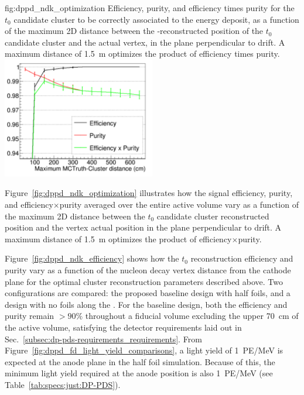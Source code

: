 \begin{dunefigure}{fig:dppd_ndk_optimization}
{Efficiency, purity, and efficiency times purity for the $t_0$ candidate cluster to be correctly associated to the  energy deposit, as a function of the maximum 2D distance between the -reconstructed position of the $t_0$ candidate cluster and the actual  vertex, in the plane perpendicular to drift. A maximum distance of \SI{1.5}{\m} optimizes the product of efficiency times purity.}
\includegraphics[width=0.5\textwidth]{graphics/dppd_ndk_optimization.pdf}
\end{dunefigure}

Figure~\ref{fig:dppd_ndk_optimization} illustrates how the  signal efficiency, purity, and efficiency$\times$purity averaged over the entire  active volume vary as a function of the maximum 2D distance between the $t_0$ candidate cluster reconstructed position and the  vertex actual position in the plane perpendicular to drift. A maximum distance of \SI{1.5}{\m} optimizes the product of efficiency$\times$purity. 

Figure~\ref{fig:dppd_ndk_efficiency} shows how the  $t_0$ reconstruction efficiency and purity vary as a function of the nucleon decay vertex distance from the cathode plane for the optimal cluster reconstruction parameters described above. Two configurations are compared: the proposed baseline design with half foils, and a design with no foils along the . For the baseline design, both the efficiency and purity remain $>90\%$ throughout a  fiducial volume excluding the upper \SI{70}{cm} of the  active volume, satisfying the detector requirements laid out in Sec.~\ref{subsec:dp-pds-requirements_requirements}. From Figure~\ref{fig:dppd_fd_light_yield_comparisons}, a light yield of \SI{1}{PE/\MeV} is expected at the anode plane in the half foil simulation. Because of this, the  minimum light yield required at the anode position is also \SI{1}{PE/\MeV} (see Table~\ref{tab:specs:just:DP-PDS}). 

